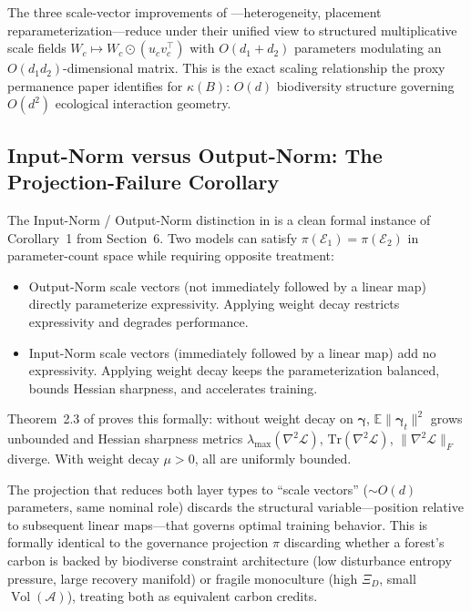 \documentclass[12pt]{article}
\newcommand{\vol}{\operatorname{Vol}}
\begin{document}
The three scale-vector improvements of \citet{Wang2026}---heterogeneity, placement
reparameterization---reduce under their unified view to structured multiplicative scale
fields $W_c \mapsto W_c \odot (u_c v_c^\top)$ with $O(d_1 + d_2)$ parameters modulating
an $O(d_1 d_2)$-dimensional matrix. This is the exact scaling relationship the proxy
permanence paper identifies for $\kappa(B)$: $O(d)$ biodiversity structure governing
$O(d^2)$ ecological interaction geometry.

\subsection{Input-Norm versus Output-Norm: The Projection-Failure Corollary}

The Input-Norm / Output-Norm distinction in \citet{Wang2026} is a clean formal instance
of Corollary~1 from Section~6. Two models can satisfy $\pi(\mathcal{E}_1)=\pi(\mathcal{E}_2)$
in parameter-count space while requiring opposite treatment:

\begin{itemize}
\item Output-Norm scale vectors (not immediately followed by a linear map) directly
parameterize expressivity. Applying weight decay restricts expressivity and degrades
performance.
\item Input-Norm scale vectors (immediately followed by a linear map) add no expressivity.
Applying weight decay keeps the parameterization balanced, bounds Hessian sharpness, and
accelerates training.
\end{itemize}

Theorem~2.3 of \citet{Wang2026} proves this formally: without weight decay on
$\boldsymbol{\gamma}$, $\mathbb{E}\|\boldsymbol{\gamma}_t\|^2$ grows unbounded and
Hessian sharpness metrics $\lambda_{\max}(\nabla^2 \mathcal{L})$,
$\mathrm{Tr}(\nabla^2\mathcal{L})$, $\|\nabla^2\mathcal{L}\|_F$ diverge. With weight
decay $\mu>0$, all are uniformly bounded.

The projection that reduces both layer types to ``scale vectors'' ($\sim O(d)$ parameters,
same nominal role) discards the structural variable---position relative to subsequent
linear maps---that governs optimal training behavior. This is formally identical to
the governance projection $\pi$ discarding whether a forest's carbon is backed by
biodiverse constraint architecture (low disturbance entropy pressure, large recovery
manifold) or fragile monoculture (high $\Xi_D$, small $\vol(\mathcal{A})$), treating
both as equivalent carbon credits.
\end{document}
